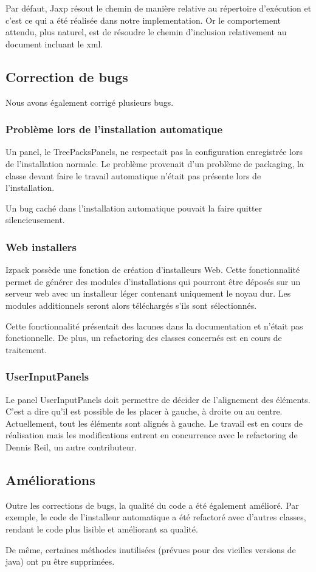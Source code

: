 Par défaut, Jaxp résout le chemin de manière relative au répertoire d'exécution et c'est ce qui a été réalisée dans notre implementation.
Or le comportement attendu, plus naturel, est de résoudre le chemin d'inclusion relativement au document incluant le xml.

\subsection{Correction de bugs}
Nous avons également corrigé plusieurs bugs.
\subsubsection{Problème lors de l'installation automatique}
Un panel, le TreePacksPanels, ne respectait pas la configuration enregistrée lors de l'installation normale. 
Le problème provenait d'un problème de packaging, la classe devant faire le travail automatique n'était pas présente lors de l'installation.

Un bug caché dans l'installation automatique pouvait la faire quitter silencieusement.
\subsubsection{Web installers}
Izpack possède une fonction de création d'installeurs Web.
Cette fonctionnalité permet de générer des modules d'installations qui pourront être déposés sur un serveur web avec un installeur léger contenant uniquement le noyau dur.
Les modules additionnels seront alors téléchargés s'ils sont sélectionnés.

Cette fonctionnalité présentait des lacunes dans la documentation et n'était pas fonctionnelle.
De plus, un refactoring des classes concernés est en cours de traitement.
\subsubsection{UserInputPanels}
Le panel UserInputPanels doit permettre de décider de l'alignement des éléments.
C'est a dire qu'il est possible de les placer à gauche, à droite ou au centre. Actuellement, tout les éléments sont alignés à gauche.
Le travail est en cours de réalisation mais les modifications entrent en concurrence avec le refactoring de Dennis Reil, un autre contributeur.

\subsection{Améliorations}
Outre les corrections de bugs, la qualité du code a été également amélioré.
Par exemple, le code de l'installeur automatique a été refactoré avec d'autres classes, rendant le code plus lisible et améliorant sa qualité.

De même, certaines méthodes inutilisées (prévues pour des vieilles versions de java) ont pu être supprimées.